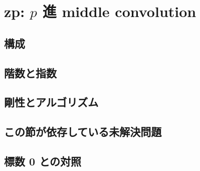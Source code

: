 
\section{zp: $p$ 進 middle convolution}

\subsection{構成}

\subsection{階数と指数}

\subsection{剛性とアルゴリズム}

\subsection{この節が依存している未解決問題}

\subsection{標数 0 との対照}
